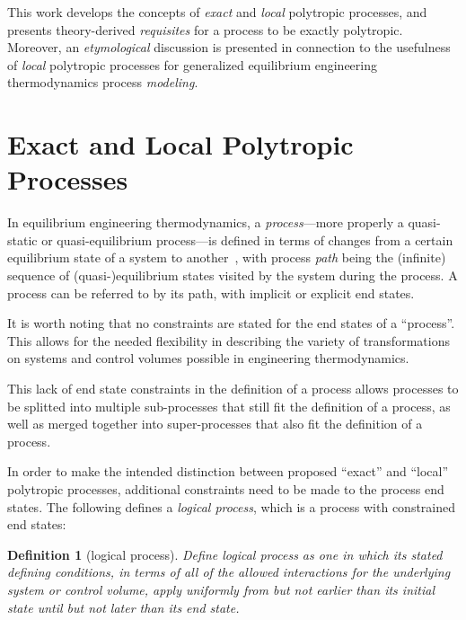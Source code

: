 \documentclass[10pt,a4paper]{article}
\newtheorem{definition}{Definition}
\begin{document}
    This work develops the concepts of \emph{exact} and \emph{local} polytropic  processes,  and
    presents theory-derived \emph{requisites} for a process to be exactly polytropic.  Moreover,
    an  \emph{etymological}  discussion  is  presented  in  connection  to  the  usefulness   of
    \emph{local} polytropic processes for  generalized  equilibrium  engineering  thermodynamics
    process \emph{modeling}.

\section{Exact and Local Polytropic Processes}

    In equilibrium engineering thermodynamics, a \emph{process}---more properly  a  quasi-static
    or quasi-equilibrium process---is defined in terms of changes  from  a  certain  equilibrium
    state of a system to  another~\cite{2013-CengelYA+BolesMA-AMGH},  with  process  \emph{path}
    being the (infinite) sequence of (quasi-)equilibrium states visited by the system during the
    process. A process can be referred to by its path, with implicit or explicit end states.

    It is worth noting that no constraints are stated for the end states of a ``process''.  This
    allows for the needed flexibility in describing the variety of  transformations  on  systems
    and control volumes possible in engineering thermodynamics.

    This lack of end state constraints in the definition of a process  allows  processes  to  be
    splitted into multiple sub-processes that still fit the definition of a process, as well as
    merged together into super-processes that also fit the definition of a process.

    In order  to  make  the  intended  distinction  between  proposed  ``exact''  and  ``local''
    polytropic processes, additional constraints need to be made to the process end states.  The
    following defines a \emph{logical process}, which is a process with constrained end states:

    \begin{definition}[logical process]\label{def:logical.proc}
        Define logical process as one in which its stated defining conditions, in terms  of  all
        of the allowed interactions for the underlying system or control volume, apply uniformly
        from but not earlier than its initial state until but not later than its end state.
    \end{definition}
\end{document}
